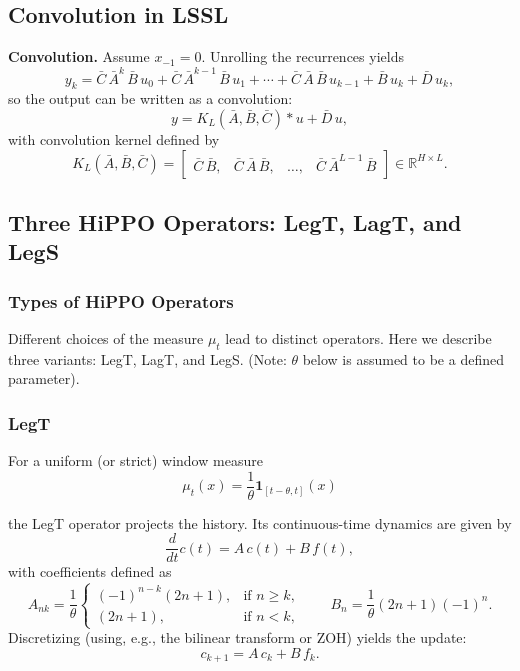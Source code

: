 \documentclass{article}
\theoremstyle{definition}
\begin{document}
\subsection{Convolution in LSSL}
\label{appendix:Convolution in LSSL}
\textbf{Convolution.}  
Assume \(x_{-1} = 0\). Unrolling the recurrences yields
\[
y_k = \bar{C}\,\bar{A}^k\,\bar{B}\,u_0 + \bar{C}\,\bar{A}^{k-1}\,\bar{B}\,u_1 + \cdots + \bar{C}\,\bar{A}\,\bar{B}\,u_{k-1} + \bar{B}\,u_k + \bar{D}\,u_k,
\]
so the output can be written as a convolution:
\[
y = K_L(\bar{A}, \bar{B}, \bar{C}) \ast u + \bar{D}\,u,
\]
with convolution kernel defined by
\[
K_L(\bar{A}, \bar{B}, \bar{C}) = \begin{bmatrix}
\bar{C}\,\bar{B}, & \bar{C}\,\bar{A}\,\bar{B}, & \dots, & \bar{C}\,\bar{A}^{L-1}\,\bar{B}
\end{bmatrix} \in \mathbb{R}^{H \times L}.
\]


\subsection{Three HiPPO Operators: LegT, LagT, and LegS}
\label{appendix:Three type of hippo}

\subsubsection{Types of HiPPO Operators}

Different choices of the measure \(\mu_t\) lead to distinct operators. Here we describe three variants: LegT, LagT, and LegS. (Note: \(\theta\) below is assumed to be a defined parameter).

\subsubsection{LegT}

For a uniform (or strict) window measure
\[
\mu_t(x) = \frac{1}{\theta} \mathbf{1}_{[t-\theta, t]}(x)
\]

the LegT operator projects the history. Its continuous-time dynamics are given by
\[
\frac{d}{dt} c(t) = A\, c(t) + B\, f(t),
\]
with coefficients defined as
\[
A_{nk} = \frac{1}{\theta}
\begin{cases}
(-1)^{n-k} (2n+1), & \text{if } n \ge k, \\
(2n+1), & \text{if } n < k,
\end{cases}
\qquad
B_n = \frac{1}{\theta} (2n+1) (-1)^n.
\]
Discretizing (using, e.g., the bilinear transform or ZOH) yields the update:
\[
c_{k+1} = A\, c_k + B\, f_k.
\]
\end{document}
